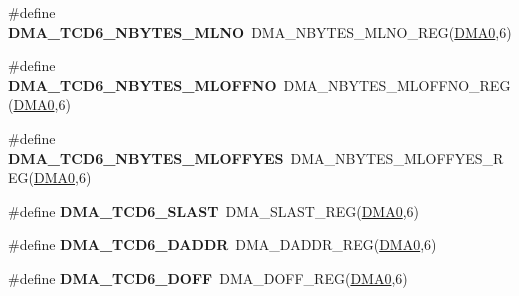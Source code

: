 \begin{DoxyCompactItemize}
\item 
\#define {\bfseries D\+M\+A\+\_\+\+T\+C\+D6\+\_\+\+N\+B\+Y\+T\+E\+S\+\_\+\+M\+L\+NO}~D\+M\+A\+\_\+\+N\+B\+Y\+T\+E\+S\+\_\+\+M\+L\+N\+O\+\_\+\+R\+EG(\hyperlink{group__DMA__Peripheral__Access__Layer_ga4103044f9ca209772f513dc694513ffb}{D\+M\+A0},6)\hypertarget{group__DMA__Register__Accessor__Macros_ga5df3e27b1d307f3799a0518af5e77b5d}{}\label{group__DMA__Register__Accessor__Macros_ga5df3e27b1d307f3799a0518af5e77b5d}

\item 
\#define {\bfseries D\+M\+A\+\_\+\+T\+C\+D6\+\_\+\+N\+B\+Y\+T\+E\+S\+\_\+\+M\+L\+O\+F\+F\+NO}~D\+M\+A\+\_\+\+N\+B\+Y\+T\+E\+S\+\_\+\+M\+L\+O\+F\+F\+N\+O\+\_\+\+R\+EG(\hyperlink{group__DMA__Peripheral__Access__Layer_ga4103044f9ca209772f513dc694513ffb}{D\+M\+A0},6)\hypertarget{group__DMA__Register__Accessor__Macros_ga665fe503506ca6d695a7b3520579678f}{}\label{group__DMA__Register__Accessor__Macros_ga665fe503506ca6d695a7b3520579678f}

\item 
\#define {\bfseries D\+M\+A\+\_\+\+T\+C\+D6\+\_\+\+N\+B\+Y\+T\+E\+S\+\_\+\+M\+L\+O\+F\+F\+Y\+ES}~D\+M\+A\+\_\+\+N\+B\+Y\+T\+E\+S\+\_\+\+M\+L\+O\+F\+F\+Y\+E\+S\+\_\+\+R\+EG(\hyperlink{group__DMA__Peripheral__Access__Layer_ga4103044f9ca209772f513dc694513ffb}{D\+M\+A0},6)\hypertarget{group__DMA__Register__Accessor__Macros_ga18f055c822e10a2c8cfdcddd8bdc61bc}{}\label{group__DMA__Register__Accessor__Macros_ga18f055c822e10a2c8cfdcddd8bdc61bc}

\item 
\#define {\bfseries D\+M\+A\+\_\+\+T\+C\+D6\+\_\+\+S\+L\+A\+ST}~D\+M\+A\+\_\+\+S\+L\+A\+S\+T\+\_\+\+R\+EG(\hyperlink{group__DMA__Peripheral__Access__Layer_ga4103044f9ca209772f513dc694513ffb}{D\+M\+A0},6)\hypertarget{group__DMA__Register__Accessor__Macros_ga672ec28af0a73ea4d68fd67e1c00c2cf}{}\label{group__DMA__Register__Accessor__Macros_ga672ec28af0a73ea4d68fd67e1c00c2cf}

\item 
\#define {\bfseries D\+M\+A\+\_\+\+T\+C\+D6\+\_\+\+D\+A\+D\+DR}~D\+M\+A\+\_\+\+D\+A\+D\+D\+R\+\_\+\+R\+EG(\hyperlink{group__DMA__Peripheral__Access__Layer_ga4103044f9ca209772f513dc694513ffb}{D\+M\+A0},6)\hypertarget{group__DMA__Register__Accessor__Macros_ga48867e3ab689be488624b105f0096275}{}\label{group__DMA__Register__Accessor__Macros_ga48867e3ab689be488624b105f0096275}

\item 
\#define {\bfseries D\+M\+A\+\_\+\+T\+C\+D6\+\_\+\+D\+O\+FF}~D\+M\+A\+\_\+\+D\+O\+F\+F\+\_\+\+R\+EG(\hyperlink{group__DMA__Peripheral__Access__Layer_ga4103044f9ca209772f513dc694513ffb}{D\+M\+A0},6)\hypertarget{group__DMA__Register__Accessor__Macros_ga4e5f76022fb322b6ad46f22afc87d44c}{}\label{group__DMA__Register__Accessor__Macros_ga4e5f76022fb322b6ad46f22afc87d44c}


\end{DoxyCompactItemize}
